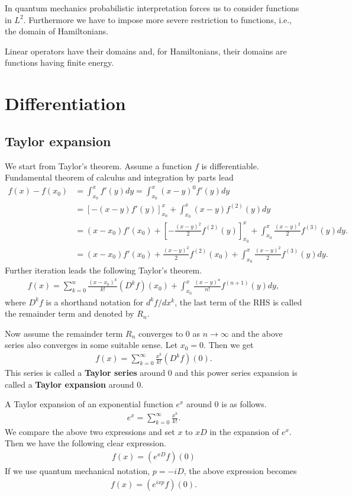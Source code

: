 \documentclass[openany, a4paper, oneside]{book}
\theoremstyle{break}
\theoremstyle{breakdefn}
\newcommand{\rbk}[1]{\left (#1\right)}
\newcommand{\sqbk}[1]{\left[#1\right]}
\begin{document}
In quantum mechanics probabilistic interpretation forces us to
consider functions in $L^2$.
Furthermore we have to impose more severe restriction to functions,
i.e., the domain of Hamiltonians.

Linear operators have their domains
and, for Hamiltonians, their domains are functions having finite energy.
\section{Differentiation}
\label{sec-4-1-4}
\subsection{Taylor expansion}
\label{sec-4-1-4-1}

We start from Taylor's theorem.
Assume a function $f$ is differentiable.
Fundamental theorem of calculus and integration by parts lead
\begin{align}
 f(x) - f(x_0)
 &=
 \int_{x_0}^{x} f'(y) dy
 =
 \int_{x_0}^x (x - y)^{0} f'(y) dy \\
 &=
 \sqbk{- \rbk{x - y} f'(y)}_{x_0}^x + \int_{x_0}^x \rbk{x - y} f^{(2)} (y) dy \\
 &=
 (x - x_0) f'(x_0) + \sqbk{- \frac{(x-y)^2}{2} f^{(2)}(y)}_{x_0}^x + \int_{x_0}^x \frac{(x - y)^2}{2} f^{(3)} (y)dy. \\
 &=
 (x - x_0) f'(x_0) + \frac{(x-y)^2}{2} f^{(2)}(x_0) + \int_{x_0}^x \frac{(x - y)^2}{2} f^{(3)} (y)dy.
\end{align}
Further iteration leads the following Taylor's theorem.
\begin{align}
 f(x)
 =
 \sum_{k=0}^{n} \frac{(x - x_0)^k}{k!} \left( D^k f \right) (x_0) +
  \int_{x_0}^{x} \frac{(x - y)^{n}}{n!} f^{(n+1)} (y) dy,
\end{align}
where $D^k f$ is a shorthand notation for  $d^k f/ dx^k$,
the last term of the RHS is called the remainder term
and denoted by $R_n$.

Now assume the remainder term $R_n$ converges to 0 as $n \to \infty$
and the above series also converges in some suitable sense.
Let $x_0 = 0$.
Then we get
\begin{align}
 f(x)
 =
 \sum_{k=0}^{\infty} \frac{x^k}{k!} \left( D^k f \right) (0).
\end{align}
This series is called a \textbf{Taylor series} around 0 and
this power series expansion is called a \textbf{Taylor expansion} around 0.

A Taylor expansion of an exponential function $e^x$ around $0$ is as follows.
\begin{align}
 e^{x}
 =
 \sum_{k=0}^{\infty} \frac{x^k}{k!}.
\end{align}
We compare the above two expressions and
set $x$ to $x D$ in the expansion of $e^x$.
Then we have the following clear expression.
\begin{align}
 f(x)
 =
 \left( e^{xD} f \right) (0)
\end{align}
If we use quantum mechanical notation, $p = -i D$, the above expression becomes
\begin{align}
 f(x)
 =
 \left( e^{ixp} f \right) (0).
\end{align}
\end{document}

